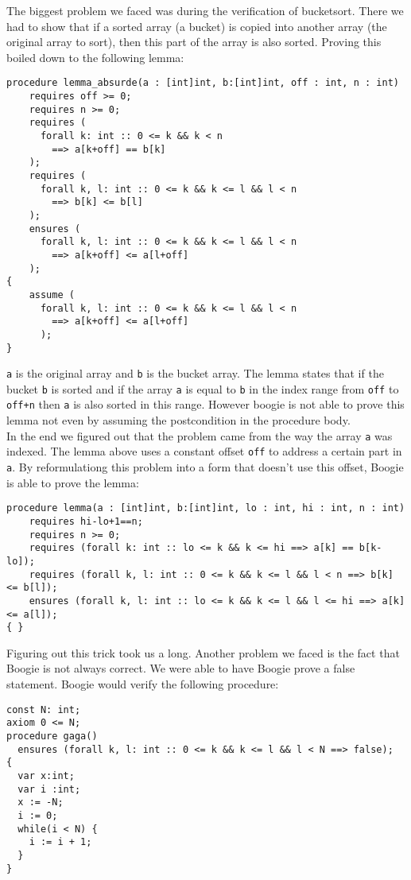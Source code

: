 The biggest problem we faced was during the verification of bucketsort. There we had to show
that if a sorted array (a bucket) is copied into another array (the original array to sort), 
then this part of the array is also sorted. Proving this boiled down to the following lemma:

\begin{verbatim}
procedure lemma_absurde(a : [int]int, b:[int]int, off : int, n : int) 
    requires off >= 0;
    requires n >= 0;
    requires (
      forall k: int :: 0 <= k && k < n 
        ==> a[k+off] == b[k]
    );
    requires (
      forall k, l: int :: 0 <= k && k <= l && l < n 
        ==> b[k] <= b[l]
    );
    ensures (
      forall k, l: int :: 0 <= k && k <= l && l < n 
        ==> a[k+off] <= a[l+off]
    );
{
    assume (
      forall k, l: int :: 0 <= k && k <= l && l < n 
        ==> a[k+off] <= a[l+off]
      );
}
\end{verbatim}

\texttt{a} is the original array and \texttt{b} is the bucket array. The lemma states that 
if the bucket \texttt{b} is sorted and if the array \texttt{a} is equal to \texttt{b} in
the index range from \texttt{off} to \texttt{off+n} then \texttt{a} is also sorted in this range.
However boogie is not able to prove this lemma not even by assuming the postcondition in the
procedure body.\\

In the end we figured out that the problem came from the way the array \texttt{a} was indexed.
The lemma above uses a constant offset \texttt{off} to address a certain part in \texttt{a}. 
By reformulationg this problem into a form that doesn't use this offset, Boogie is able
to prove the lemma:

\begin{verbatim}
procedure lemma(a : [int]int, b:[int]int, lo : int, hi : int, n : int) 
    requires hi-lo+1==n;
    requires n >= 0;
    requires (forall k: int :: lo <= k && k <= hi ==> a[k] == b[k-lo]);
    requires (forall k, l: int :: 0 <= k && k <= l && l < n ==> b[k] <= b[l]);
    ensures (forall k, l: int :: lo <= k && k <= l && l <= hi ==> a[k] <= a[l]);
{ }
\end{verbatim}

Figuring out this trick took us a long. 
Another problem we faced is the fact that Boogie is not always correct. We were able to have Boogie prove 
a false statement. Boogie would verify the following procedure:

\begin{verbatim}
const N: int;
axiom 0 <= N;
procedure gaga()
  ensures (forall k, l: int :: 0 <= k && k <= l && l < N ==> false); 
{
  var x:int;
  var i :int;
  x := -N;
  i := 0;
  while(i < N) { 
    i := i + 1;
  }
}
\end{verbatim}

